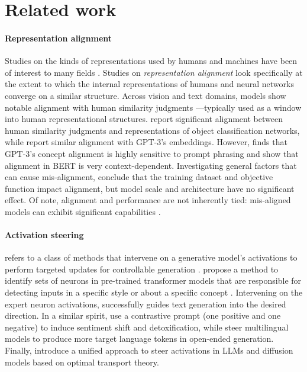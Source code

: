 \section{Related work}
\paragraph{Representation alignment}

Studies on the kinds of representations used by humans and machines have been of interest to many fields \citep[e.g., cognitive science, neuroscience, and machine learning;][]{hebart2020revealing, Khosla2022, muttenthaler2023human, tian2022contrastive}. Studies on \textit{representation alignment} \cite{sucholutsky2024gettin} look specifically at the extent to which the internal representations of humans and neural networks converge on a similar structure. 
Across vision and text domains, models show notable alignment with human similarity judgments ---typically used as a window into human representational structures. \citet{peterson2018} report significant alignment between human similarity judgments and representations of object classification networks, while \citet{digutsch2023overlap} report similar alignment with GPT-3’s \citep{gpt3} embeddings. However, \citet{shaki2023cognitive} finds that GPT-3's concept alignment is highly sensitive to prompt phrasing and
\citet{misra-etal-2020-exploring} show that alignment in BERT \citep{bert} is very context-dependent.  Investigating general factors that can cause mis-alignment, %
\citet{muttenthaler2023human} conclude that the training dataset and objective function impact alignment, but model scale and architecture have no significant effect. Of note, alignment and performance are not inherently tied: mis-aligned models can exhibit significant capabilities \cite{sucholutsky2023alignment, dessì2023communication}. %


 



\paragraph{Activation steering} refers to a class of methods that intervene on a generative model's activations to perform targeted updates for controllable generation \cite{rodriguez2024controlling, iti, rimsky_steering}. \citet{suau2023self} propose a method to identify sets of neurons in pre-trained transformer models that are responsible for detecting inputs in a specific style \citep[e.g., toxic language]{suau2024whispering} or about a specific concept \citep[e.g., ``dog'']{suau2023self}. Intervening on the expert neuron activations, %
successfully guides text generation into the desired direction. In a similar spirit, \citet{turner2024_steering} use a contrastive prompt (one positive and one negative) to induce sentiment shift and detoxification, while
\citet{kojima2024multilingual} steer multilingual models to produce more target language tokens in open-ended generation. Finally, \citet{rodriguez2024controlling} introduce a unified approach to steer activations in LLMs and diffusion models based on optimal transport theory.